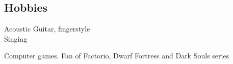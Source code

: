 \documentclass[]{external}
\begin{document}
\begin{paracol}{2}
    \section{Hobbies} 
    \textbullet{} Acoustic Guitar, fingerstyle \\
    \textbullet{} Singing \\
    \begin{hangingpar}
        \textbullet{} Computer games. Fan of Factorio, Dwarf Fortress and Dark Souls series
    \end{hangingpar}
    \sectionsep
\end{paracol}
\end{document}
